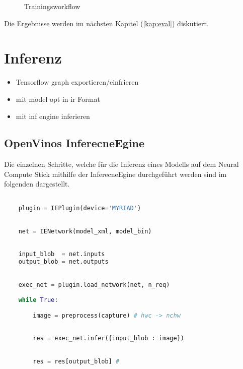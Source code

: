 %     


\begin{figure}[H]
    \centering
    
    \caption{Trainingsworkflow}
    \label{fig:train_workflow}
\end{figure}


Die Ergebnisse werden im nächsten Kapitel (\ref{kap:eval}) diskutiert.

\section{Inferenz}

\begin{itemize}
    \item Tensorflow graph exportieren/einfrieren
    \item mit model opt in ir Format
    \item mit inf engine inferieren
\end{itemize}


\subsection{OpenVinos InferecneEgine}

Die einzelnen Schritte, welche für die Inferenz eines Modells 
auf dem Neural Compute Stick mithilfe der InferecneEgine 
durchgeführt werden sind im folgenden dargestellt.


\begin{minipage}{0.30\textwidth}
    \centering
    
    \label{}
\end{minipage}
\begin{minipage}{0.70\textwidth}

\begin{lstlisting}[language=Python]

    plugin = IEPlugin(device='MYRIAD')

        
    net = IENetwork(model_xml, model_bin)
        
    
    input_blob  = net.inputs
    output_blob = net.outputs
        

    exec_net = plugin.load_network(net, n_req)
        
    while True:

        image = preprocess(capture) # hwc -> nchw
        
        
        res = exec_net.infer({input_blob : image})
        

        res = res[output_blob] #
        
        
\end{lstlisting}
\vspace{1.5cm}
\end{minipage}

